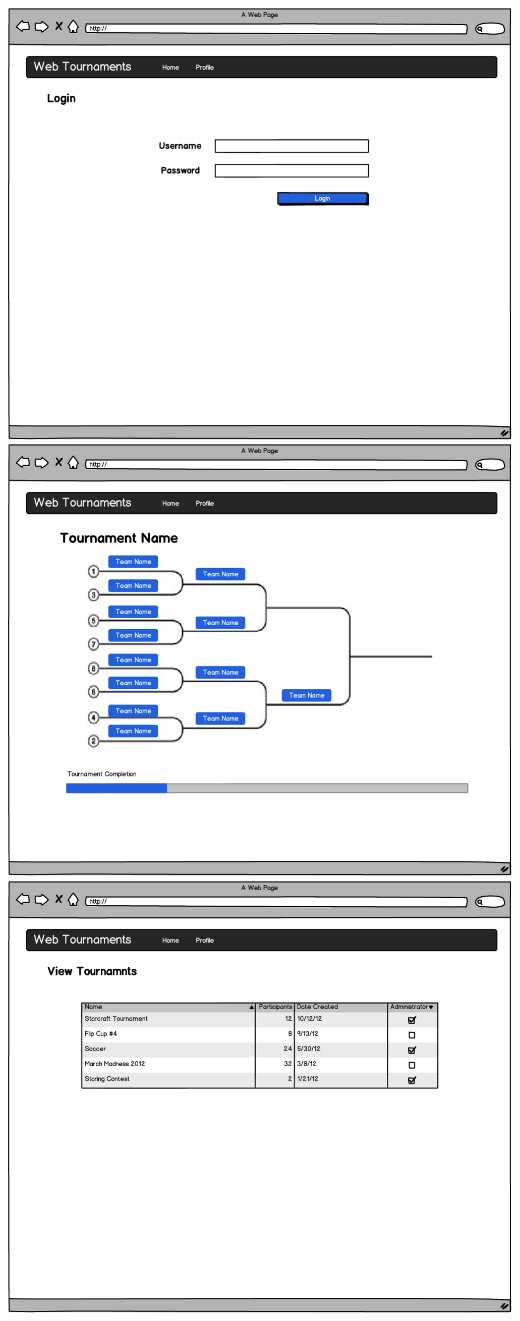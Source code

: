 \documentclass{article}
\begin{document}
\includegraphics[width=1\textwidth]{three}
\newpage
\includegraphics[width=1\textwidth]{four}
\newpage
\includegraphics[width=1\textwidth]{five}
\end{document}
